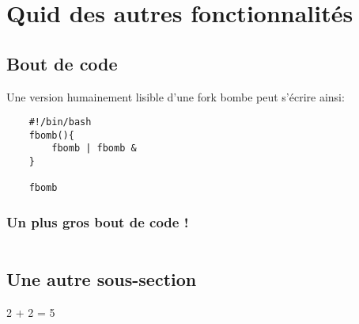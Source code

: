 \section{Quid des autres fonctionnalités \?}

\subsection{Bout de code}
Une version humainement lisible d'une fork bombe peut s'écrire ainsi:
\begin{verbatim}
    #!/bin/bash
    fbomb(){
        fbomb | fbomb &
    }

    fbomb
\end{verbatim}

\subsubsection{Un plus gros bout de code !}
\inputminted{python}{}

\subsection{Une autre sous-section}

2 + 2 = 5